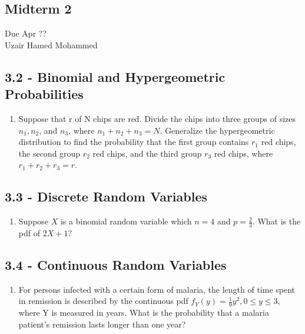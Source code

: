 \documentclass{article}
\begin{document}
\begin{center}
	\section*{Midterm 2}
	Due Apr ?? \\
	Uzair Hamed Mohammed
\end{center}


\subsection*{3.2 - Binomial and Hypergeometric Probabilities}
\begin{enumerate}
	\item[33.] Suppose that r of N chips are red. Divide the chips into three groups of sizes \(n_1, n_2\), and \(n_3\), where \(n_1 + n_2 + n_3 = N\). Generalize the hypergeometric distribution to find the probability that the first group contains \(r_1\) red chips, the second group \(r_2\) red chips, and the third group \(r_3\) red chips, where \(r_1 + r_2 + r_3 = r\).
\end{enumerate}

\subsection*{3.3 - Discrete Random Variables}
\begin{enumerate}
	\item[11.] Suppose \(X\) is a binomial random variable which \(n = 4\) and \(p = \frac{2}{3}\). What is the pdf of \(2X + 1\)?
\end{enumerate}

\subsection*{3.4 - Continuous Random Variables}
\begin{enumerate}
	\item[4.] For persons infected with a certain form of malaria, the length of time spent in remission is described by the continuous pdf \(f_Y (y) = \frac{1}{9} y^2, 0 \leq y \leq 3\), where Y is measured in years. What is the probability that a malaria patient's remission lasts longer than one year?
\end{enumerate}
\end{document}
